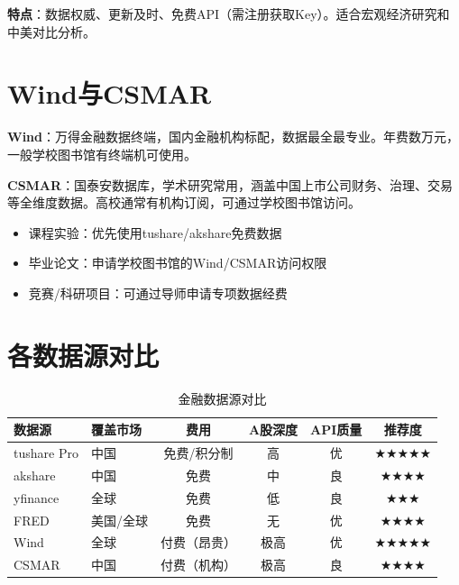 \textbf{特点}：数据权威、更新及时、免费API（需注册获取Key）。适合宏观经济研究和中美对比分析。

\section{Wind与CSMAR}

\textbf{Wind}：万得金融数据终端，国内金融机构标配，数据最全最专业。年费数万元，一般学校图书馆有终端机可使用。

\textbf{CSMAR}：国泰安数据库，学术研究常用，涵盖中国上市公司财务、治理、交易等全维度数据。高校通常有机构订阅，可通过学校图书馆访问。

\begin{notebox}[学术数据获取建议]
\begin{itemize}[leftmargin=1em]
  \item 课程实验：优先使用tushare/akshare免费数据
  \item 毕业论文：申请学校图书馆的Wind/CSMAR访问权限
  \item 竞赛/科研项目：可通过导师申请专项数据经费
\end{itemize}
\end{notebox}

\section{各数据源对比}

\begin{table}[H]
\centering
\small
\begin{tabular}{llcccc}
\toprule
\textbf{数据源} & \textbf{覆盖市场} & \textbf{费用} & \textbf{A股深度} & \textbf{API质量} & \textbf{推荐度} \\
\midrule
tushare Pro & 中国 & 免费/积分制 & 高 & 优 & ★★★★★ \\
akshare & 中国 & 免费 & 中 & 良 & ★★★★ \\
yfinance & 全球 & 免费 & 低 & 良 & ★★★ \\
FRED & 美国/全球 & 免费 & 无 & 优 & ★★★★ \\
Wind & 全球 & 付费（昂贵） & 极高 & 优 & ★★★★★ \\
CSMAR & 中国 & 付费（机构） & 极高 & 良 & ★★★★ \\
\bottomrule
\end{tabular}
\caption{金融数据源对比}
\end{table}

